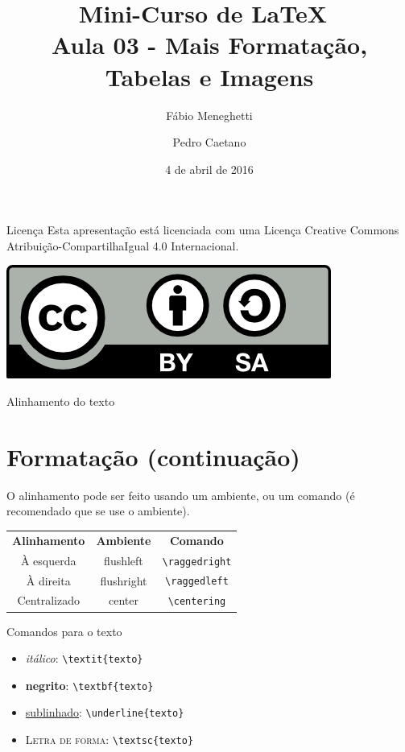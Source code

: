 \documentclass[12pt]{beamer}
\title{Mini-Curso de \LaTeX\ \\ Aula 03 - Mais Formatação, Tabelas e Imagens}
\author{Fábio Meneghetti \and Pedro Caetano}
\date{4 de abril de 2016}
\begin{document}
\begin{frame}
  \titlepage
\end{frame}

\begin{frame}{Licença}
  Esta apresentação está licenciada com uma Licença Creative Commons Atribuição-CompartilhaIgual 4.0 Internacional.
  \begin{center}
    \includegraphics[scale=0.3]{../license.png}
  \end{center}
\end{frame}

\begin{frame}
  \tableofcontents
\end{frame}

\begin{frame}[fragile]{Alinhamento do texto}
  \section{Formatação (continuação)}
  O alinhamento pode ser feito usando um ambiente, ou um comando (é recomendado que se use o ambiente).
  \begin{center}
    \begin{tabular}{ccc}
    \textbf{Alinhamento} & \textbf{Ambiente} & \textbf{Comando}\\
    À esquerda & flushleft & \verb+\raggedright+\\
    À direita & flushright & \verb+\raggedleft+\\
    Centralizado & center & \verb+\centering+\\
    \end{tabular}
  \end{center}
\end{frame}

\begin{frame}[fragile]{Comandos para o texto}
  \begin{itemize}
    \item \textit{itálico}: \verb+\textit{texto}+
    \item \textbf{negrito}: \verb+\textbf{texto}+
    \item \underline{sublinhado}: \verb+\underline{texto}+
    \item \textsc{Letra de forma}: \verb+\textsc{texto}+
  \end{itemize}
\end{frame}
\end{document}
